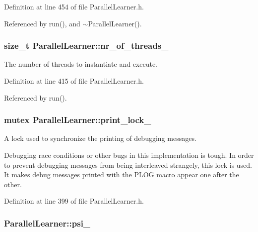Definition at line 454 of file Parallel\-Learner.\-h.



Referenced by run(), and $\sim$\-Parallel\-Learner().

\hypertarget{classParallelLearner_a170a0abad017845877039684507e7a66}{
\subsubsection[{nr\-\_\-of\-\_\-threads\-\_\-}]{\setlength{\rightskip}{0pt plus 5cm}size\-\_\-t Parallel\-Learner\-::nr\-\_\-of\-\_\-threads\-\_\-\hspace{0.3cm}{\ttfamily [protected]}}}\label{classParallelLearner_a170a0abad017845877039684507e7a66}


The number of threads to instantiate and execute. 



Definition at line 415 of file Parallel\-Learner.\-h.



Referenced by run().

\hypertarget{classParallelLearner_a5bc71a2c35fa976d792bf0e80de31a39}{
\subsubsection[{print\-\_\-lock\-\_\-}]{\setlength{\rightskip}{0pt plus 5cm}mutex Parallel\-Learner\-::print\-\_\-lock\-\_\-\hspace{0.3cm}{\ttfamily [static]}}}\label{classParallelLearner_a5bc71a2c35fa976d792bf0e80de31a39}


A lock used to synchronize the printing of debugging messages. 

Debugging race conditions or other bugs in this implementation is tough. In order to prevent debugging messages from being interleaved strangely, this lock is used. It makes debug messages printed with the P\-L\-O\-G macro appear one after the other. 

Definition at line 399 of file Parallel\-Learner.\-h.

\hypertarget{classParallelLearner_ae5d7eda773fa4cc5412b24dac9c5b542}{
\subsubsection[{psi\-\_\-}]{ Parallel\-Learner\-::psi\-\_\-}}\label{classParallelLearner_ae5d7eda773fa4cc5412b24dac9c5b542}


